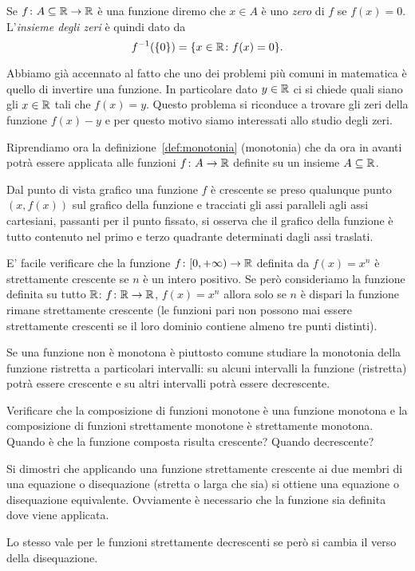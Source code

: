 \begin{definition}[zeri]
  Se $f\colon A\subseteq {\mathbb R} \to {\mathbb R}$ è una funzione diremo che
  $x\in A$ è uno \emph{zero} di $f$ se $f(x)=0$.
  L'\emph{insieme degli zeri}%
%
  è quindi dato da
  \[
    f^{-1}({\left\{ 0 \right\}}) = {\left\{ x\in {\mathbb R}\colon f(x) = 0 \right\}}.
  \]
\end{definition}

Abbiamo già accennato al fatto che uno dei problemi più comuni in
matematica è quello di invertire una funzione. In particolare 
dato $y\in {\mathbb R}$ ci si chiede quali siano gli $x\in {\mathbb R}$ 
tali che $f(x)=y$. 
Questo problema si riconduce
a trovare gli zeri della funzione $f(x)-y$ e per questo motivo 
siamo interessati allo studio degli zeri.

Riprendiamo ora la definizione~\ref{def:monotonia} (monotonia) che da ora in avanti 
potrà essere applicata alle funzioni $f\colon A \to {\mathbb R}$ definite 
su un insieme $A\subseteq {\mathbb R}$.

Dal punto di vista grafico una funzione $f$ è crescente
se preso qualunque punto $(x,f(x))$ sul grafico della funzione
e tracciati gli assi paralleli agli assi cartesiani, passanti
per il punto fissato, si osserva che il grafico della funzione
è tutto contenuto nel primo e terzo quadrante determinati
dagli assi traslati.

E' facile verificare che la funzione $f\colon [0,+\infty)\to {\mathbb R}$
definita da $f(x)=x^n$
è strettamente crescente se $n$ è un intero positivo.
Se però consideriamo la funzione definita su tutto
${\mathbb R}$: $f\colon {\mathbb R} \to {\mathbb R}$,
$f(x)=x^n$ allora solo se $n$ è dispari la funzione rimane
strettamente crescente
(le funzioni pari non possono mai essere strettamente crescenti se
il loro dominio contiene almeno tre punti distinti).

Se una funzione non è monotona è piuttosto comune studiare 
la monotonia della funzione ristretta a particolari intervalli: 
su alcuni intervalli la funzione (ristretta) potrà essere crescente e su altri 
intervalli potrà essere decrescente.

\begin{exercise}
Verificare che la composizione di funzioni monotone è una
funzione monotona e la composizione di funzioni strettamente
monotone è strettamente monotona.
Quando è che la funzione composta risulta crescente?
Quando decrescente?
\end{exercise}

\begin{exercise}
Si dimostri che applicando una funzione strettamente crescente ai due
membri di una equazione o disequazione (stretta o larga che sia)
si ottiene una equazione o disequazione equivalente.
Ovviamente è necessario che la funzione sia definita dove viene applicata.

Lo stesso vale per le funzioni strettamente decrescenti 
se però si cambia il verso della disequazione.
\end{exercise}

